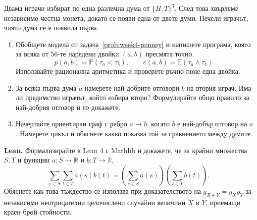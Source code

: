\documentclass[11pt,a4paper]{article}
\newenvironment{enumeratea}{\begin{enumerate}[label=(\alph*),itemsep=0.28em,topsep=0.25em]}{\end{enumerate}}
\newcommand{\Pbb}{\mathbb P}
\newcommand{\Ebb}{\mathbb E}
\begin{document}
\begin{researchtask}
Двама играчи избират по една различна дума от $\{H,T\}^3$.
След това хвърляме независимо честна монета, докато се появи една от двете думи.
Печели играчът, чиято дума се е появила първа.
\begin{enumeratea}
  \item Обобщете модела от задача~\ref{prob:week4-penney} и напишете програма,
  която за всяка от 56-те наредени двойки $(a,b)$ пресмята точно
  \[
  p(a,b)=\Pbb(\tau_a<\tau_b),\qquad
  e(a,b)=\Ebb(\tau_a\wedge\tau_b).
  \]
  Използвайте рационална аритметика и проверете ръчно поне една двойка.
  \item За всяка първа дума $a$ намерете най-добрите отговори $b$ на втория
  играч. Има ли предимство играчът, който избира втори?
  Формулирайте общо правило за най-добрия отговор и го докажете.
  \item Начертайте ориентиран граф с ребро $a\to b$, когато $b$ е най-добър
  отговор на $a$. Намерете цикъл и обяснете какво показва той за сравнението
  между думите.
\end{enumeratea}
\end{researchtask}

\noindent\textbf{Lean.} Формализирайте в Lean 4 с Mathlib и докажете, че
за крайни множества $S,T$ и функции $a:S\to\mathbb R$ и $b:T\to\mathbb R$,
\[
\sum_{s\in S}\sum_{t\in T}a(s)b(t)
=
\left(\sum_{s\in S}a(s)\right)
\left(\sum_{t\in T}b(t)\right).
\]
Обяснете как това тъждество се използва при доказателството на
$g_{X+Y}=g_Xg_Y$ за независими неотрицателни целочислени случайни
величини $X$ и $Y$, приемащи краен брой стойности.
\end{document}

